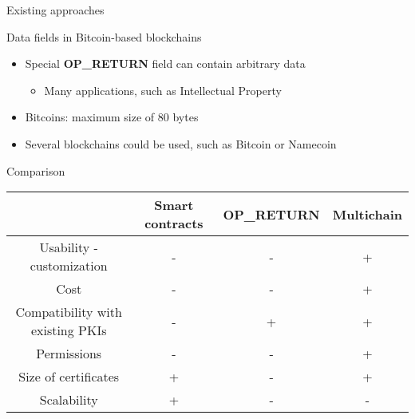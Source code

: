 \begin{frame}{Existing approaches}
	\begin{exampleblock}{Data fields in Bitcoin-based blockchains}
		\begin{itemize}
			\item Special \textbf{OP\_RETURN} field can contain arbitrary data
			\begin{itemize}
				\item Many applications, such as Intellectual Property
			\end{itemize}
			\item Bitcoins: maximum size of 80 bytes
			\item Several blockchains could be used, such as Bitcoin or Namecoin
		\end{itemize}
	\end{exampleblock}
\end{frame}




\begin{frame}{Comparison}

\begin{tabular}{|c|c|c|c|}
\hline 
  & Smart contracts & OP\_RETURN & Multichain \\ 
\hline 
Usability - customization & - & - & + \\ 
\hline 
Cost & - & - & + \\ 
\hline 
Compatibility with existing PKIs & - & + & + \\ 
\hline 
Permissions & - & - & + \\ 
\hline 
Size of certificates & + & - & + \\ 
\hline 
Scalability & + & - & - \\ 
\hline 
\end{tabular} 

\end{frame}
















%
%

